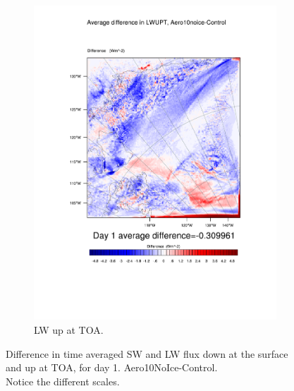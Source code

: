 \begin{figure}
\begin{subfigure}{0.48\textwidth}
		\includegraphics[width=\textwidth]{results/aero10ni/diff_Aero10NoIce_LWUPT_Day1.pdf}
		\caption{LW up at TOA.}
		\label{subfig:lwup_r4Day1}
	\end{subfigure}
	\caption{Difference in time averaged SW and LW flux down at the surface and up at TOA, for day 1. Aero10NoIce-Control.\\Notice the different scales.}
	\label{fig:radiation_r4Day1}
\end{figure}


